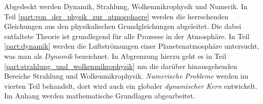 \documentclass{book}
\begin{document}
Abgedeckt werden Dynamik, Strahlung, Wolkenmikrophysik und Numerik. In Teil \ref{part:von_der_physik_zur_atmosphaere} werden die herrschenden Gleichungen aus den physikalischen Grundgleichungen abgeleitet. Die dabei entfaltete Theorie ist grundlegend für alle Prozesse in der Atmosphäre. In Teil \ref{part:dynamik} werden die Luftströmungen einer Planetenatmosphäre untersucht, was man als \textit{Dynamik} bezeichnet. In Abgrenzung hierzu geht es in Teil \ref{part:strahlung_und_wolkenmikrophysik} um die darüber hinausgehenden Bereiche Strahlung und Wolkenmikrophysik. \textit{Numerische Probleme} werden im vierten Teil behandelt, dort wird auch ein globaler \textit{dynamischer Kern} entwickelt. Im Anhang werden mathematische Grundlagen abgearbeitet.
\end{document}
